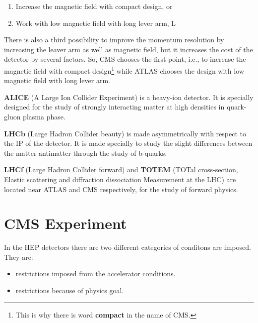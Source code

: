 \begin{enumerate}
	\item Increase the magnetic field with compact design, or
	\item Work with low magnetic field with long lever arm, L
\end{enumerate}

There is also a third possibility to improve the momentum resolution by increasing the leaver arm as well as magnetic field, but it increases the cost of the detector by several factors. So, CMS chooses the first point, i.e., to increase the magnetic field with compact design\footnote{This is why there is word {\bf compact} in the name of CMS.} while ATLAS chooses the design with low magnetic field with long lever arm.


{\bf ALICE} (A Large Ion Collider Experiment) is a heavy-ion detector. It is specially designed for the study of strongly interacting matter at high densities in quark-gluon plasma phase.

{\bf LHCb} (Large Hadron Collider beauty) is made asymmetrically with respect to the IP of the detector. It is made specially to study the slight differences between the matter-antimatter through the study of b-quarks.

{\bf LHCf} (Large Hadron Collider forward) and {\bf TOTEM} (TOTal cross-section, Elastic scattering and diffraction dissociation Measurement at the LHC) are located near ATLAS and CMS respectively, for the study of forward physics.

\section{CMS Experiment} %
\label{sec:cms_experiment}
In the HEP detectors there are two different categories of conditons are imposed. They are:

\begin{itemize}
	\item restrictions imposed from the accelerator conditions.
	\item restrictions because of physics goal.
\end{itemize}


